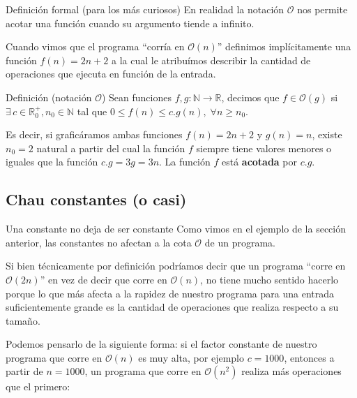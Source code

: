 \documentclass{beamer}
\begin{document}
    \begin{frame}{Definición formal (para los más curiosos)}
        En realidad la notación $\mathcal{O}$ nos permite acotar una función cuando su argumento tiende a infinito. \pause 

        Cuando vimos que el programa ``corría en $\mathcal{O}(n)$'' definimos implícitamente una función $f(n) = 2n+2$ a la cual le atribuímos describir la cantidad de operaciones que ejecuta en función de la entrada. \pause
        \begin{block}{Definición (notación $\mathcal{O}$)}
            Sean funciones $f,g : \mathbb{N} \rightarrow \mathbb{R}$, decimos que $f \in \mathcal{O}(g)$ si $\exists \, c \in \mathbb{R}^+_0, n_0 \in \mathbb{N}$ tal que $0 \leq f(n) \leq c . g(n), \; \forall n \geq n_0$.
        \end{block}

        \pause

        Es decir, si graficáramos ambas funciones $f(n) = 2n+2$ y $g(n) = n$, existe $n_0 = 2$ natural a partir del cual la función $f$ siempre tiene valores menores o iguales que la función $c . g = 3g = 3n$. \pause La función $f$ está \textbf{acotada} por $c . g$.
    \end{frame}

    \subsection{Chau constantes (o casi)}
    \begin{frame}
    \end{frame}

    \begin{frame}{Una constante no deja de ser constante}
        Como vimos en el ejemplo de la sección anterior, las constantes no afectan a la cota $\mathcal{O}$ de un programa. \pause

        Si bien técnicamente por definición podríamos decir que un programa ``corre en $\mathcal{O}(2n)$'' en vez de decir que corre en $\mathcal{O}(n)$, no tiene mucho sentido hacerlo porque lo que más afecta a la rapidez de nuestro programa para una entrada suficientemente grande es la cantidad de operaciones que realiza respecto a su tamaño. \pause

        \vspace{8pt}

    Podemos pensarlo de la siguiente forma: si el factor constante de nuestro programa que corre en $\mathcal{O}(n)$ es muy alta, por ejemplo $c = 1000$, entonces a partir de $n = 1000$, un programa que corre en $\mathcal{O}(n^2)$ realiza más operaciones que el primero:
    \end{frame}
\end{document}
